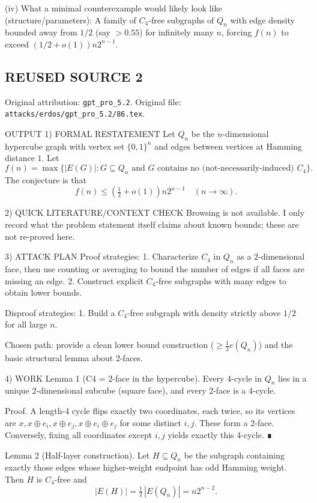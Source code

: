 (iv) What a minimal counterexample would likely look like (structure/parameters):
A family of $C_4$-free subgraphs of $Q_n$ with edge density bounded away from $1/2$ (say $>0.55$) for infinitely many $n$,
forcing $f(n)$ to exceed $(1/2+o(1))n2^{n-1}$.



\subsection*{REUSED SOURCE 2}
Original attribution: \texttt{gpt\_pro\_5.2}.
Original file: \texttt{attacks/erdos/gpt\_pro\_5.2/86.tex}.


OUTPUT
1) FORMAL RESTATEMENT
Let $Q_n$ be the $n$-dimensional hypercube graph with vertex set $\{0,1\}^n$ and edges between
vertices at Hamming distance $1$. Let
\[f(n)=\max\{|E(G)|: G\subseteq Q_n\text{ and }G\text{ contains no (not-necessarily-induced) }C_4\}.\]
The conjecture is that
\[f(n)\le \left(\tfrac12+o(1)\right)n2^{n-1} \quad (n\to\infty).\]

2) QUICK LITERATURE/CONTEXT CHECK
Browsing is not available. I only record what the problem statement itself claims about known
bounds; these are not re-proved here.

3) ATTACK PLAN
Proof strategies:
1. Characterize $C_4$ in $Q_n$ as a 2-dimensional face, then use counting or averaging to
   bound the number of edges if all faces are missing an edge.
2. Construct explicit $C_4$-free subgraphs with many edges to obtain lower bounds.

Disproof strategies:
1. Build a $C_4$-free subgraph with density strictly above $1/2$ for all large $n$.

Chosen path: provide a clean lower bound construction ($\ge \tfrac12 e(Q_n)$) and the basic
structural lemma about 2-faces.

4) WORK
Lemma 1 (C4 = 2-face in the hypercube).
Every 4-cycle in $Q_n$ lies in a unique 2-dimensional subcube (square face), and every 2-face is a
4-cycle.

Proof.
A length-4 cycle flips exactly two coordinates, each twice, so its vertices are
$x, x\oplus e_i, x\oplus e_j, x\oplus e_i\oplus e_j$ for some distinct $i,j$. These form a 2-face.
Conversely, fixing all coordinates except $i,j$ yields exactly this 4-cycle. ∎

Lemma 2 (Half-layer construction).
Let $H\subseteq Q_n$ be the subgraph containing exactly those edges whose higher-weight endpoint
has odd Hamming weight. Then $H$ is $C_4$-free and
\[|E(H)|=\tfrac12\,|E(Q_n)|=n2^{n-2}.\]

